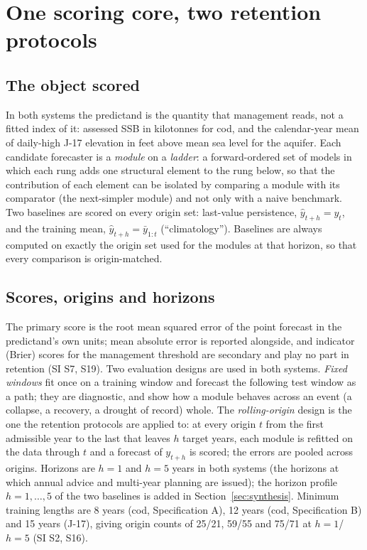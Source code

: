 \section{One scoring core, two retention protocols}\label{sec:design}

\subsection{The object scored}\label{sec:object}

In both systems the predictand is the quantity that management reads, not a fitted index of it: assessed SSB in kilotonnes for cod, and the calendar-year mean of daily-high J-17 elevation in feet above mean sea level for the aquifer. Each candidate forecaster is a \emph{module} on a \emph{ladder}: a forward-ordered set of models in which each rung adds one structural element to the rung below, so that the contribution of each element can be isolated by comparing a module with its comparator (the next-simpler module) and not only with a naive benchmark. Two baselines are scored on every origin set: last-value persistence, $\hat y_{t+h}=y_t$, and the training mean, $\hat y_{t+h}=\bar y_{1:t}$ (``climatology''). Baselines are always computed on exactly the origin set used for the modules at that horizon, so that every comparison is origin-matched.

\subsection{Scores, origins and horizons}\label{sec:scores}

The primary score is the root mean squared error of the point forecast in the predictand's own units; mean absolute error is reported alongside, and indicator (Brier) scores for the management threshold are secondary and play no part in retention (SI S7, S19). Two evaluation designs are used in both systems. \emph{Fixed windows} fit once on a training window and forecast the following test window as a path; they are diagnostic, and show how a module behaves across an event (a collapse, a recovery, a drought of record) whole. The \emph{rolling-origin} design \citep{Tashman2000} is the one the retention protocols are applied to: at every origin $t$ from the first admissible year to the last that leaves $h$ target years, each module is refitted on the data through $t$ and a forecast of $y_{t+h}$ is scored; the errors are pooled across origins. Horizons are $h=1$ and $h=5$ years in both systems (the horizons at which annual advice and multi-year planning are issued); the horizon profile $h=1,\dots,5$ of the two baselines is added in Section~\ref{sec:synthesis}. Minimum training lengths are 8 years (cod, Specification A), 12 years (cod, Specification B) and 15 years (J-17), giving origin counts of 25/21, 59/55 and 75/71 at $h=1$/$h=5$ (SI S2, S16).

